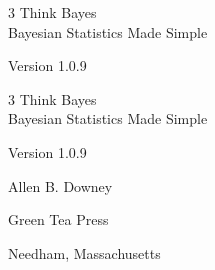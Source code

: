\documentclass[12pt]{book}
\newcommand{\thetitle}{Think Bayes}
\newcommand{\thesubtitle}{Bayesian Statistics Made Simple}
\newcommand{\theversion}{1.0.9}
\begin{document}
\begin{latexonly}

\renewcommand{\topfraction}{0.9}
\renewcommand{\blankpage}{\thispagestyle{empty} \quad \newpage}


\thispagestyle{empty}

\begin{flushright}
\vspace*{2.0in}

\begin{spacing}{3}
{\huge \thetitle}\\
{\Large \thesubtitle}
\end{spacing}

\vspace{0.25in}

Version \theversion

\vfill

\end{flushright}


\blankpage
\blankpage

\pagebreak
\thispagestyle{empty}

\begin{flushright}
\vspace*{2.0in}

\begin{spacing}{3}
{\huge \thetitle}\\
{\Large \thesubtitle}
\end{spacing}

\vspace{0.25in}

Version \theversion

\vspace{1in}


{\Large
Allen B. Downey\\
}


\vspace{0.5in}

{\Large Green Tea Press}

{\small Needham, Massachusetts}

\vfill

\end{flushright}


\pagebreak
\thispagestyle{empty}


\end{latexonly}
\end{document}
